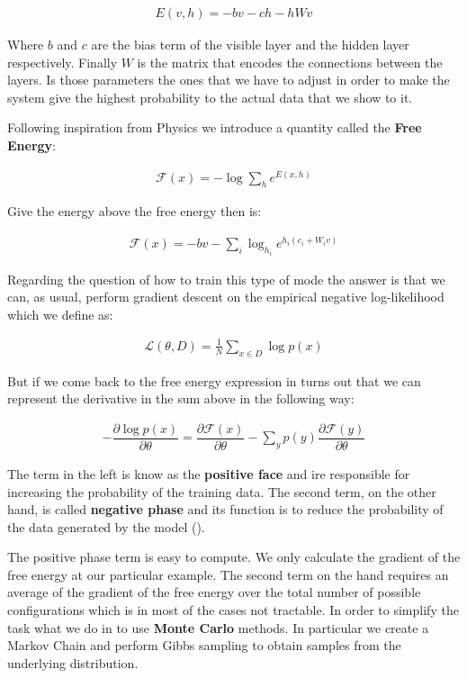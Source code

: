 \documentclass[11pt,a4paper]{article}
\begin{document}
\begin{align*}
E(v, h) = -bv -ch - hWv 
\end{align*}

Where $b$ and $c$ are the bias term of the visible layer and the hidden layer respectively. Finally $W$ is the matrix that encodes the connections between the layers. Is those parameters the ones that we have to adjust in order to make the system give the highest probability to the actual data that we show to it. 

Following inspiration from Physics we introduce a quantity called the \textbf{Free Energy}: 

\begin{align*}
\mathcal{F}(x) = - \log \sum_{h} e^{E(x, h)}
\end{align*}

Give the energy above the free energy then is:

\begin{align*}
\mathcal{F}(x) = -bv - \sum_i \log_{h_i} e^{h_i(c_i + W_i v)}
\end{align*}

Regarding the question of how to train this type of mode the answer is that we can, as usual, perform gradient descent on the empirical negative log-likelihood which we define as: 


\begin{align*}
\mathcal{L}(\theta, D) = \frac{1}{N} \sum_{x \in D} \log p(x)
\end{align*}

But if we come back to the free energy expression in turns out that we can represent the derivative in the sum above in the following way:

\begin{align*}
- \dfrac{\partial{\log p(x)}}{\partial{\theta}} = \dfrac{\partial{\mathcal{F}(x)}}{\partial{\theta}} - \sum_{y} p(y) \dfrac{\partial{\mathcal{F}(y)}}{\partial{\theta}}
\end{align*}

The term in the left is know as the \textbf{positive face} and ire responsible for increasing the probability of the training data. The second term, on the other hand, is called \textbf{negative phase} and its function is to reduce the probability of the data generated by the model (\cite{yoshua2009learning}).

The positive phase term is easy to compute. We only calculate the gradient of the free energy at our particular example. The second term on the hand requires an average of the gradient of the free energy over the total number of possible configurations which is in most of the cases not tractable. In order to simplify the task what we do in to use \textbf{Monte Carlo} methods. In particular we create a Markov Chain and perform Gibbs sampling to obtain samples from the underlying distribution. 
\end{document}
